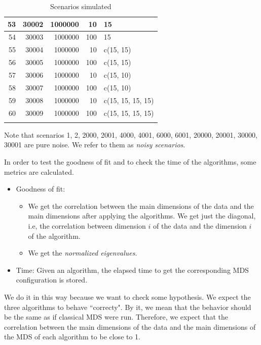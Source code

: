 \documentclass[11pt]{report}
\begin{document}
\begin{longtable}{|r|r|r|r|l|}
\hline
53 & 30002 & 1000000 & 10 & 15 \\ 
\hline
54 & 30003 & 1000000 & 100 & 15 \\ 
\hline
55 & 30004 & 1000000 & 10 & c(15, 15) \\ 
\hline
56 & 30005 & 1000000 & 100 & c(15, 15) \\ 
\hline
57 & 30006 & 1000000 & 10 & c(15, 10) \\ 
\hline
58 & 30007 & 1000000 & 100 & c(15, 10) \\ 
\hline
59 & 30008 & 1000000 & 10 & c(15, 15, 15, 15) \\ 
\hline
60 & 30009 & 1000000 & 100 & c(15, 15, 15, 15) \\ 
\hline
\caption{Scenarios simulated} 
\label{scenearios_sim}
\end{longtable}

\indent Note that scenarios 1, 2, 2000, 2001, 4000, 4001, 6000, 6001, 20000,
20001, 30000, 30001 are pure noise. We refer to them as \textit{noisy 
scenarios}.

\indent In order to test the goodness of fit and to check the time of the 
algorithms, some metrics are calculated.

\begin{itemize}
\item Goodness of fit:
\begin{itemize}


\item We get the correlation between the main dimensions of the data and the
main dimensions after applying the algorithms. We get just the diagonal, i.e,
the correlation between dimension $i$ of the data and the dimension $i$ of the
algorithm. 

\item We get the \textit{normalized eigenvalues}.
\end{itemize}

\item Time: Given an algorithm, the elapsed time to get the corresponding MDS
configuration is stored.

\end{itemize}

\indent We do it in this way because we want to check some hypothesis. We 
expect the three algorithms to behave ``correcty". By it, we mean that the
behavior should be the same as if classical MDS were run. Therefore, we 
expect that the correlation between the main dimensions of the data and the
main dimensions of the MDS of each algorithm to be close to 1.
\end{document}
